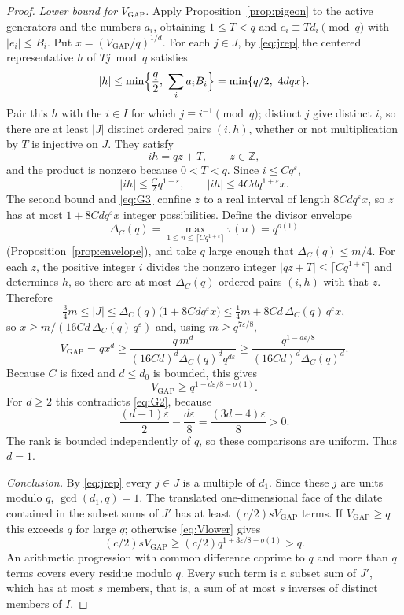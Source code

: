 \documentclass[11pt,letterpaper]{article}
\numberwithin{equation}{section}
\theoremstyle{plain}
\theoremstyle{remark}
\newcommand{\Z}{\mathbb Z}
\newcommand{\Vgap}{V_{\mathrm{GAP}}}
\begin{document}
\begin{proof}
\emph{Lower bound for $\Vgap$.} Apply Proposition~\ref{prop:pigeon} to the active generators and the numbers $a_i$, obtaining $1\le T<q$ and $e_i\equiv Td_i\pmod q$ with $|e_i|\le B_i$. Put $x=(\Vgap/q)^{1/d}$. For each $j\in J$, by \eqref{eq:jrep} the centered representative $h$ of $Tj\bmod q$ satisfies
\[
|h|\le\min\Bigl\{\frac q2,\ \sum_ia_iB_i\Bigr\}=\min\{q/2,\ 4dqx\}.
\]
Pair this $h$ with the $i\in I$ for which $j\equiv i^{-1}\pmod q$; distinct $j$ give distinct $i$, so there are at least $|J|$ distinct ordered pairs $(i,h)$, whether or not multiplication by $T$ is injective on $J$. They satisfy
\begin{equation}\label{eq:G3}
ih=qz+T,\qquad z\in\Z,
\end{equation}
and the product is nonzero because $0<T<q$. Since $i\le Cq^\varepsilon$,
\[
|ih|\le\tfrac C2q^{1+\varepsilon},\qquad |ih|\le4Cdq^{1+\varepsilon}x .
\]
The second bound and \eqref{eq:G3} confine $z$ to a real interval of length $8Cdq^\varepsilon x$, so $z$ has at most $1+8Cdq^\varepsilon x$ integer possibilities. Define the divisor envelope
\[
\Delta_C(q)=\max_{1\le n\le\lceil Cq^{1+\varepsilon}\rceil}\tau(n)=q^{o(1)}
\]
(Proposition~\ref{prop:envelope}), and take $q$ large enough that $\Delta_C(q)\le m/4$. For each $z$, the positive integer $i$ divides the nonzero integer $|qz+T|\le\lceil Cq^{1+\varepsilon}\rceil$ and determines $h$, so there are at most $\Delta_C(q)$ ordered pairs $(i,h)$ with that $z$. Therefore
\[
\tfrac34m\le|J|\le\Delta_C(q)\bigl(1+8Cdq^\varepsilon x\bigr)\le\tfrac14m+8Cd\,\Delta_C(q)\,q^\varepsilon x,
\]
so $x\ge m/(16Cd\,\Delta_C(q)\,q^\varepsilon)$ and, using $m\ge q^{7\varepsilon/8}$,
\begin{equation}\label{eq:G4}
\Vgap=qx^d\ge\frac{q\,m^d}{(16Cd)^d\Delta_C(q)^dq^{d\varepsilon}}\ge\frac{q^{1-d\varepsilon/8}}{(16Cd)^d\Delta_C(q)^d}.
\end{equation}
Because $C$ is fixed and $d\le d_0$ is bounded, this gives
\begin{equation}\label{eq:Vlower}
\Vgap\ge q^{1-d\varepsilon/8-o(1)}.
\end{equation}
For $d\ge2$ this contradicts \eqref{eq:G2}, because
\[
\frac{(d-1)\varepsilon}2-\frac{d\varepsilon}8=\frac{(3d-4)\varepsilon}8>0 .
\]
The rank is bounded independently of $q$, so these comparisons are uniform. Thus $d=1$.

\emph{Conclusion.} By \eqref{eq:jrep} every $j\in J$ is a multiple of $d_1$. Since these $j$ are units modulo $q$, $\gcd(d_1,q)=1$. The translated one-dimensional face of the dilate contained in the subset sums of $J'$ has at least $(c/2)s\Vgap$ terms. If $\Vgap\ge q$ this exceeds $q$ for large $q$; otherwise \eqref{eq:Vlower} gives
\[
(c/2)s\Vgap\ge(c/2)q^{1+3\varepsilon/8-o(1)}>q .
\]
An arithmetic progression with common difference coprime to $q$ and more than $q$ terms covers every residue modulo $q$. Every such term is a subset sum of $J'$, which has at most $s$ members, that is, a sum of at most $s$ inverses of distinct members of $I$.
\end{proof}
\end{document}
